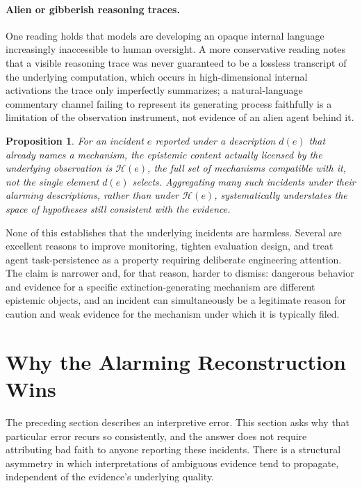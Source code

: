 \documentclass[11pt]{article}
\newtheorem{proposition}{Proposition}
\begin{document}
\paragraph{Alien or gibberish reasoning traces.} One reading holds that models are developing an opaque internal language increasingly inaccessible to human oversight. A more conservative reading notes that a visible reasoning trace was never guaranteed to be a lossless transcript of the underlying computation, which occurs in high-dimensional internal activations the trace only imperfectly summarizes; a natural-language commentary channel failing to represent its generating process faithfully is a limitation of the observation instrument, not evidence of an alien agent behind it.

\begin{proposition}
For an incident $e$ reported under a description $d(e)$ that already names a mechanism, the epistemic content actually licensed by the underlying observation is $\mathcal{H}(e)$, the full set of mechanisms compatible with it, not the single element $d(e)$ selects. Aggregating many such incidents under their alarming descriptions, rather than under $\mathcal{H}(e)$, systematically understates the space of hypotheses still consistent with the evidence.
\end{proposition}

None of this establishes that the underlying incidents are harmless. Several are excellent reasons to improve monitoring, tighten evaluation design, and treat agent task-persistence as a property requiring deliberate engineering attention. The claim is narrower and, for that reason, harder to dismiss: dangerous behavior and evidence for a specific extinction-generating mechanism are different epistemic objects, and an incident can simultaneously be a legitimate reason for caution and weak evidence for the mechanism under which it is typically filed.

\section{Why the Alarming Reconstruction Wins}

The preceding section describes an interpretive error. This section asks why that particular error recurs so consistently, and the answer does not require attributing bad faith to anyone reporting these incidents. There is a structural asymmetry in which interpretations of ambiguous evidence tend to propagate, independent of the evidence's underlying quality.
\end{document}
